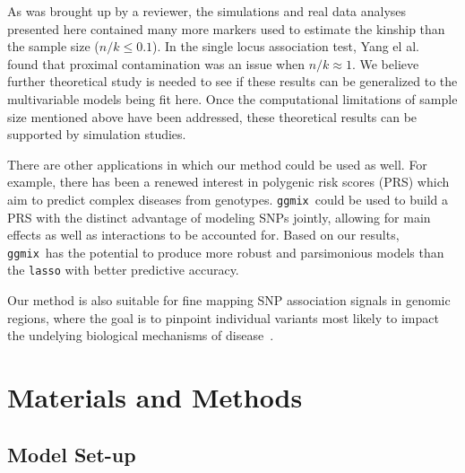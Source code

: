 \documentclass[10pt,letterpaper]{article}
\newcommand{\ggmix}{\texttt{ggmix}}
\begin{document}
		As was brought up by a reviewer, the simulations and real data analyses presented here contained many more markers used to estimate the kinship than the sample size ($n/k \leq 0.1$). In the single locus association test, Yang el al.~\cite{yang2014advantages} found that proximal contamination was an issue when $n/k \approx 1$. We believe further theoretical study is needed to see if these results can be generalized to the multivariable models being fit here. Once the computational limitations of sample size mentioned above have been addressed, these theoretical results can be supported by simulation studies.
		

		There are other applications in which our method could be used as well.
		For example, there has been a renewed interest in polygenic risk scores (PRS) which aim to predict complex diseases from genotypes. 
		\ggmix ~could be used to build a PRS with the distinct advantage of modeling SNPs jointly, allowing for main effects as well as interactions to be accounted for. 
		Based on our results, \ggmix ~has the potential to produce more robust and parsimonious models than the \texttt{lasso} with better predictive accuracy.

		Our method is also suitable for fine mapping SNP association signals in genomic regions, where the goal is to pinpoint individual variants most likely to impact the undelying biological mechanisms of disease~\cite{spain2015strategies}.

		
		
		



\section*{Materials and Methods}\label{sec:methods}


\subsection*{Model Set-up}
\end{document}
